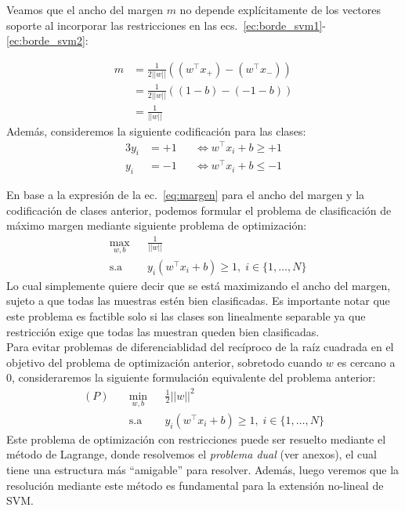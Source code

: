 Veamos que el ancho del margen $m$ no depende explícitamente de los vectores soporte al incorporar las restricciones en las ecs.~\eqref{ec:borde_svm1}-\eqref{ec:borde_svm2}:

\begin{align}
    m &= \frac{1}{2||w||} \left( (w^\top x_{+}) - (w^\top x_{-})\right)\nonumber\\
    &= \frac{1}{2||w||} \left((1-b) - (-1-b)\right)\nonumber\\
    &= \frac{1}{||w||}\label{eq:margen}
\end{align}
Además, consideremos la siguiente codificación para las clases:
\begin{alignat}{3}
    y_i&=+1 &&\Leftrightarrow w^\top x_i + b \geq +1 \label{eq:codif_svm1}\\
    y_i &=-1 &&\Leftrightarrow w^\top x_i + b \leq -1\label{eq:codif_svm2}
 \end{alignat}
 
En base a la expresión de la ec.~\eqref{eq:margen} para el ancho del margen y la codificación de clases anterior, podemos formular el problema de clasificación de máximo margen mediante  siguiente problema de optimización:
\begin{equation}
\begin{aligned}
& \underset{w,b}{\text{max}}
& & \frac{1}{||w||}\\
& \text{s.a}
& & y_i (w^\top x_i +b) \geq 1, \; i \in\{ 1, \ldots, N\}
\end{aligned}
\end{equation}
Lo cual simplemente quiere decir que se está maximizando el ancho del margen, sujeto a que todas las muestras estén bien clasificadas. Es importante notar que este problema es factible solo si las clases son linealmente separable ya que restricción exige que todas las muestran queden bien clasificadas.\\

Para evitar problemas de diferenciablidad del recíproco de la raíz cuadrada en el objetivo del problema de optimización anterior, sobretodo cuando $w$ es cercano a 0, consideraremos la siguiente formulación equivalente del problema anterior:
\begin{equation}
\begin{aligned}
(P)\quad & \underset{w,b}{\min}
& & \frac{1}{2}||w||^2\\
& \text{s.a}
& & y_i (w^\top x_i +b) \geq 1, \; i \in\{ 1, \ldots, N\}
\end{aligned}
\end{equation}
Este problema de optimización con restricciones puede ser resuelto mediante el método de Lagrange, donde resolvemos el \emph{problema dual} (ver anexos), el cual tiene una estructura más ``amigable'' para resolver. Además, luego veremos que la resolución mediante este método es fundamental para la extensión no-lineal de SVM.\\

